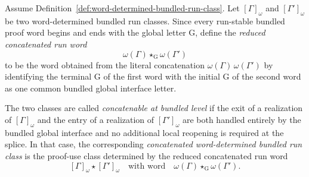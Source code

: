 \begin{definition}
\label{def:concatenable-word-determined-bundled-run-classes}
Assume Definition~\ref{def:word-determined-bundled-run-class}. Let $[\Gamma]_{\omega}$ and $[\Gamma']_{\omega}$ be two word-determined bundled run classes. Since every run-stable bundled proof word begins and ends with the global letter $\mathrm G$, define the \emph{reduced concatenated run word}
\[
\omega(\Gamma)\star_{\mathrm G}\omega(\Gamma')
\]
to be the word obtained from the literal concatenation $\omega(\Gamma)\,\omega(\Gamma')$ by identifying the terminal $\mathrm G$ of the first word with the initial $\mathrm G$ of the second word as one common bundled global interface letter.

The two classes are called \emph{concatenable at bundled level} if the exit of a realization of $[\Gamma]_{\omega}$ and the entry of a realization of $[\Gamma']_{\omega}$ are both handled entirely by the bundled global interface and no additional local reopening is required at the splice. In that case, the corresponding \emph{concatenated word-determined bundled run class} is the proof-use class determined by the reduced concatenated run word
\[
[\Gamma]_{\omega}\star[\Gamma']_{\omega}
\quad\text{with word}\quad
\omega(\Gamma)\star_{\mathrm G}\omega(\Gamma').
\]
\end{definition}

